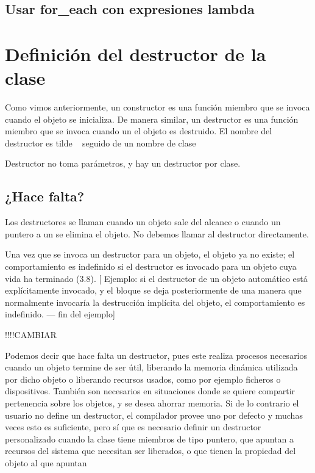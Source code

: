 \documentclass[10pt]{article}
\begin{document}
\subsection{Usar for\_each con expresiones lambda}

\vspace{2em}
\section{Definici\'on del destructor de la clase}

Como vimos anteriormente, un constructor es una función miembro que se invoca cuando el objeto
se inicializa. De manera similar, un destructor es una función miembro que se invoca cuando un
el objeto es destruido. El nombre del destructor es tilde ~ seguido de un nombre de clase

Destructor no toma parámetros, y hay un destructor por clase.

\subsection{¿Hace falta?}

Los destructores se llaman cuando un objeto sale del alcance o cuando un puntero a un
se elimina el objeto. No debemos llamar al destructor directamente.

Una vez que se invoca un destructor para un objeto, el objeto ya no existe; el comportamiento es indefinido si el destructor es
invocado para un objeto cuya vida ha terminado (3.8). [ Ejemplo: si el destructor de un objeto automático está explícitamente
invocado, y el bloque se deja posteriormente de una manera que normalmente invocaría la destrucción implícita del objeto,
el comportamiento es indefinido. — fin del ejemplo]

!!!!CAMBIAR

Podemos decir que hace falta un destructor, pues este realiza procesos necesarios cuando un objeto
termine de ser útil, liberando la memoria dinámica utilizada por dicho objeto o liberando recursos
usados, como por ejemplo ficheros o dispositivos. También son necesarios en situaciones donde se
quiere compartir pertenencia sobre los objetos, y se desea ahorrar memoria. Si de lo contrario el usuario
no define un destructor, el compilador provee uno por defecto y muchas veces esto es suficiente, pero sí
que es necesario definir un destructor personalizado cuando la clase tiene miembros de tipo puntero,
que apuntan a recursos del sistema que necesitan ser liberados, o que tienen la propiedad del objeto al
que apuntan
\end{document}
